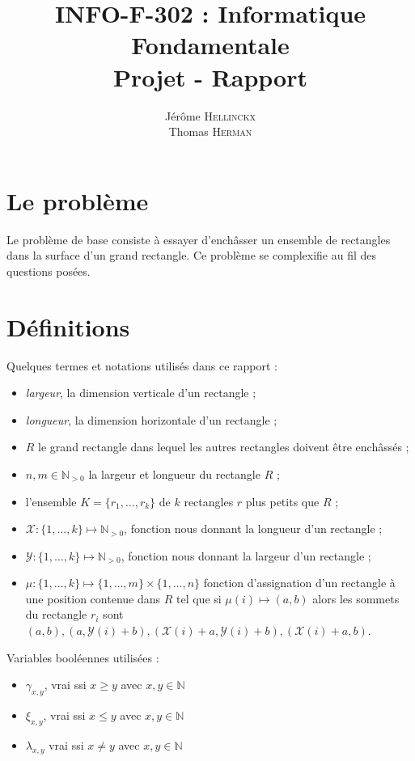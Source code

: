 \documentclass[a4paper]{article}
\title{{\textsc{INFO-F-302} : Informatique Fondamentale} \\ Projet - Rapport}
\author{Jérôme \textsc{Hellinckx} \\ Thomas \textsc{Herman}}
\begin{document}
\renewcommand{\labelitemi}{$\bullet$}

\maketitle

\section{Le problème}
Le problème de base consiste à essayer d'enchâsser un ensemble de rectangles dans la surface d'un grand rectangle. Ce problème se complexifie au fil des questions posées. 

\section{Définitions}
Quelques termes et notations utilisés dans ce rapport : 
\begin{itemize}
	\item \textit{largeur}, la dimension verticale d'un rectangle ;
	\item \textit{longueur}, la dimension horizontale d'un rectangle ;
	\item $R$ le grand rectangle dans lequel les autres rectangles doivent être enchâssés ;
	\item $ n,m \in \mathbb{N}_{>0} $ la largeur et longueur du rectangle $R$ ;
	\item l'ensemble $K = \{r_1,\dots ,r_k\}$ de $k$ rectangles $r$ plus petits que $R$ ;
	\item $\mathcal{X}:\{1,\dots,k\} \mapsto \mathbb{N}_{>0} $, fonction nous donnant la longueur d'un rectangle ;
	\item $\mathcal{Y}:\{1,\dots,k\} \mapsto \mathbb{N}_{>0} $, fonction nous donnant la largeur d'un rectangle ;
	\item $\mu :\{1,\dots,k\} \mapsto \{1,\dots,m\}\times\{1,\dots,n\}$ fonction d'assignation d'un rectangle à une position contenue dans $R$ tel que si $\mu(i) \mapsto (a,b)$ alors les sommets du rectangle $r_i$ sont $(a,b), (a,\mathcal{Y}(i)+b), (\mathcal{X}(i)+a,\mathcal{Y}(i)+b), (\mathcal{X}(i)+a,b)$.\\
	
	
\end{itemize}


Variables booléennes utilisées :
\begin{itemize}
	\item $\gamma_{x,y}$, vrai ssi $x \geq y$ avec $x,y \in \mathbb{N}$
	\item $\xi_{x,y}$, vrai ssi $x \leq y$ avec $x,y \in \mathbb{N}$
 	\item $\lambda_{x,y}$ vrai ssi $x \neq y$ avec $x,y \in \mathbb{N}$
	
\end{itemize}
\end{document}
